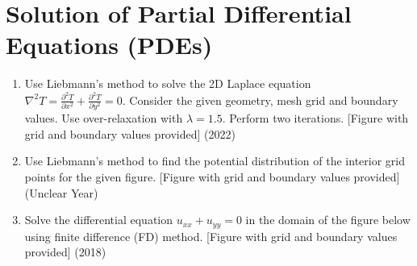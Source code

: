 \documentclass[12pt, a4paper]{article}
\begin{document}
	\section{Solution of Partial Differential Equations (PDEs)}
	\begin{enumerate}
		\item Use Liebmann's method to solve the 2D Laplace equation $\nabla^2 T = \frac{\partial^2 T}{\partial x^2} + \frac{\partial^2 T}{\partial y^2} = 0$. Consider the given geometry, mesh grid and boundary values. Use over-relaxation with $\lambda=1.5$. Perform two iterations. [Figure with grid and boundary values provided] (2022)
		\item Use Liebmann's method to find the potential distribution of the interior grid points for the given figure. [Figure with grid and boundary values provided] (Unclear Year)
		\item Solve the differential equation $u_{xx} + u_{yy} = 0$ in the domain of the figure below using finite difference (FD) method. [Figure with grid and boundary values provided] (2018)
	\end{enumerate}
	
\end{document}
